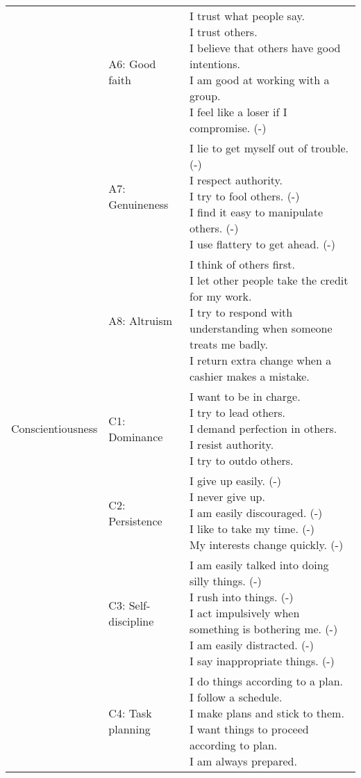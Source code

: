 \documentclass[,man,floatsintext]{apa6}
\theoremstyle{definition}
\theoremstyle{definition}
\theoremstyle{definition}
\theoremstyle{remark}
\begin{document}
\begin{longtable}[t]{lll}
\addlinespace
 & A6: Good faith & \makecell[l]{I trust what people say.\\I trust others.\\I believe that others have good intentions.\\I am good at working with a group.\\I feel like a loser if I compromise. (-)}\\
\addlinespace
 & A7: Genuineness & \makecell[l]{I lie to get myself out of trouble. (-)\\I respect authority.\\I try to fool others. (-)\\I find it easy to manipulate others. (-)\\I use flattery to get ahead. (-)}\\
\addlinespace
 & A8: Altruism & \makecell[l]{I think of others first.\\I let other people take the credit for my work.\\I try to respond with understanding when someone treats me badly.\\I return extra change when a cashier makes a mistake.}\\
\addlinespace
Conscientiousness & C1: Dominance & \makecell[l]{I want to be in charge.\\I try to lead others.\\I demand perfection in others.\\I resist authority.\\I try to outdo others.}\\
\addlinespace
 & C2: Persistence & \makecell[l]{I give up easily. (-)\\I never give up.\\I am easily discouraged. (-)\\I like to take my time. (-)\\My interests change quickly. (-)}\\
\addlinespace
 & C3: Self-discipline & \makecell[l]{I am easily talked into doing silly things. (-)\\I rush into things. (-)\\I act impulsively when something is bothering me. (-)\\I am easily distracted. (-)\\I say inappropriate things. (-)}\\
\addlinespace
 & C4: Task planning & \makecell[l]{I do things according to a plan.\\I follow a schedule.\\I make plans and stick to them.\\I want things to proceed according to plan.\\I am always prepared.}\\

\end{longtable}
\end{document}
